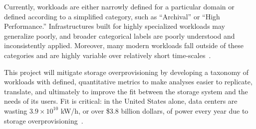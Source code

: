 Currently, workloads are either narrowly defined for a particular domain or
defined according to a simplified category, such as ``Archival'' or ``High
Performance.'' Infrastructures built for highly specialized workloads may
generalize poorly, and broader categorical labels are poorly understood and
inconsistently applied.  Moreover, many modern workloads fall outside of these
categories and are highly variable over relatively short
time-scales~\cite{google_dist_store_2015}.


This project will mitigate storage overprovisioning by developing a
taxonomy of workloads with defined, quantitative metrics to make analyses
easier to replicate, translate, and ultimately to improve the fit between the
storage system and the needs of its users. Fit is critical: in the United States alone, data centers are wasting
$3.9\times10^{10}$ kW/h, or over \$3.8 billion dollars, of power every year due
to storage overprovisioning~\cite{nrdc}.

%








